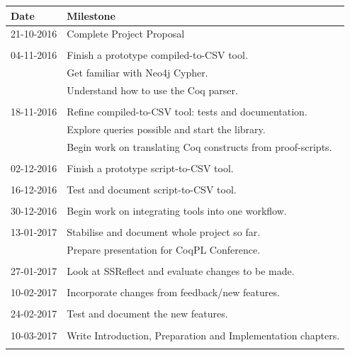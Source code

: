\documentclass[12pt]{article}
\begin{document}
\begin{tabular}{ l | l }
    Date & Milestone \\
    \hline

	21-10-2016	&	Complete Project Proposal \\ \\
          
	04-11-2016	&	Finish a prototype compiled-to-CSV tool. \\ 
				&	Get familiar with Neo4j Cypher. \\
				&	Understand how to use the Coq parser. \\ \\

	18-11-2016	&	Refine compiled-to-CSV tool: tests and documentation. \\
				&	Explore queries possible and start the library. \\
				&	Begin work on translating Coq constructs from proof-scripts. \\ \\

    02-12-2016	&	Finish a prototype script-to-CSV tool. \\ \\

    16-12-2016	&	Test and document script-to-CSV tool. \\ \\

    30-12-2016	&	Begin work on integrating tools into one workflow. \\ \\

	13-01-2017	&	Stabilise and document whole project so far. \\
				&	Prepare presentation for CoqPL Conference. \\ \\

    27-01-2017	&	Look at SSReflect and evaluate changes to be made. \\ \\

    10-02-2017	&	Incorporate changes from feedback/new features. \\ \\

    24-02-2017	&	Test and document the new features. \\ \\

	10-03-2017	&	Write Introduction, Preparation and Implementation chapters. \\ \\


\end{tabular}
\end{document}
